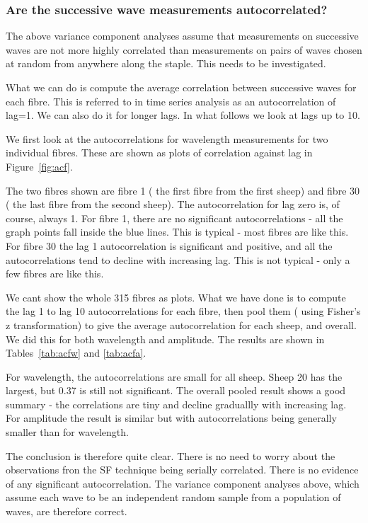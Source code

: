 \documentclass[titlepage,10pt]{article}  %
\begin{document}
\subsubsection{Are the successive wave measurements autocorrelated?}
The above variance component analyses assume that measurements on successive waves are not more highly correlated than measurements on pairs of waves chosen at random from anywhere along the staple. This needs to be investigated.

What we can do is compute the average correlation between successive waves for each fibre. This is referred to in time series analysis as an autocorrelation of lag=1. We can also do it for longer lags. In what follows we look at lags up to 10.

We first look at the autocorrelations for wavelength measurements for two individual fibres. These are shown as plots of correlation against lag in Figure~\ref{fig:acf}.

The two fibres shown are fibre 1 ( the first fibre from the first sheep) and fibre 30 ( the last fibre from the second sheep). The autocorrelation for lag zero is, of course, always 1. For fibre 1, there are no significant autocorrelations - all the graph points fall inside the blue lines. This is typical - most fibres are like this. For fibre 30 the lag 1 autocorrelation is significant and positive, and all the autocorrelations tend to decline with increasing lag. This is not typical - only a few fibres are like this.

We cant show the whole 315 fibres as plots. What we have done is to compute the lag 1 to lag 10 autocorrelations for each fibre, then pool them ( using Fisher's z transformation) to give the average autocorrelation for each sheep, and overall. We did this for both wavelength and amplitude. The results are shown in Tables~\ref{tab:acfw} and \ref{tab:acfa}.


For wavelength, the autocorrelations are small for all sheep. Sheep 20 has the largest, but 0.37 is still not significant. The overall pooled result shows a good summary - the correlations are tiny and decline graduallly with increasing lag.
For amplitude the result is similar but with autocorrelations being generally smaller than for wavelength.

The conclusion is therefore quite clear. There is no need to worry about the observations fron the SF technique being serially correlated. There is no evidence of any significant autocorrelation. The variance component analyses above, which assume each wave to be an independent random sample from a population of waves, are therefore correct.
\end{document}
